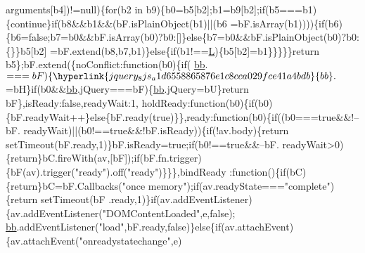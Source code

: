 \begin{DoxyCode}
      arguments[b4])!=null)\{\textcolor{keywordflow}{for}(b2 in b9)\{b0=b5[b2];b1=b9[b2];\textcolor{keywordflow}{if}(b5===b1)\{\textcolor{keywordflow}{continue}\}\textcolor{keywordflow}{if}(b8&&b1&&(bF.isPlainObject(b1)||(b6
      =bF.isArray(b1))))\{\textcolor{keywordflow}{if}(b6)\{b6=\textcolor{keyword}{false};b7=b0&&bF.isArray(b0)?b0:[]\}\textcolor{keywordflow}{else}\{b7=b0&&bF.isPlainObject(b0)?b0:\{\}\}b5[b2]
      =bF.extend(b8,b7,b1)\}\textcolor{keywordflow}{else}\{\textcolor{keywordflow}{if}(b1!==\hyperlink{jquery_8js_a38ee4c0b5f4fe2a18d0c783af540d253}{L})\{b5[b2]=b1\}\}\}\}\}\textcolor{keywordflow}{return} b5\};bF.extend(\{noConflict:\textcolor{keyword}{function}(b0)\{\textcolor{keywordflow}{if}(
      \hyperlink{jquery_8js_a1d6558865876e1c8cca029fce41a4bdb}{bb}.$===bF)\{\hyperlink{jquery_8js_a1d6558865876e1c8cca029fce41a4bdb}{bb}.$=bH\}\textcolor{keywordflow}{if}(b0&&\hyperlink{jquery_8js_a1d6558865876e1c8cca029fce41a4bdb}{bb}.jQuery===bF)\{\hyperlink{jquery_8js_a1d6558865876e1c8cca029fce41a4bdb}{bb}.jQuery=bU\}\textcolor{keywordflow}{return} bF\},isReady:\textcolor{keyword}{false},readyWait:1,
      holdReady:\textcolor{keyword}{function}(b0)\{\textcolor{keywordflow}{if}(b0)\{bF.readyWait++\}\textcolor{keywordflow}{else}\{bF.ready(\textcolor{keyword}{true})\}\},ready:\textcolor{keyword}{function}(b0)\{\textcolor{keywordflow}{if}((b0===\textcolor{keyword}{true}&&!--bF.
      readyWait)||(b0!==\textcolor{keyword}{true}&&!bF.isReady))\{\textcolor{keywordflow}{if}(!av.body)\{\textcolor{keywordflow}{return} setTimeout(bF.ready,1)\}bF.isReady=\textcolor{keyword}{true};\textcolor{keywordflow}{if}(b0!==\textcolor{keyword}{true}&&--bF.
      readyWait>0)\{\textcolor{keywordflow}{return}\}bC.fireWith(av,[bF]);\textcolor{keywordflow}{if}(bF.fn.trigger)\{bF(av).trigger(\textcolor{stringliteral}{"ready"}).off(\textcolor{stringliteral}{"ready"})\}\}\},bindReady
      :\textcolor{keyword}{function}()\{\textcolor{keywordflow}{if}(bC)\{\textcolor{keywordflow}{return}\}bC=bF.Callbacks(\textcolor{stringliteral}{"once memory"});\textcolor{keywordflow}{if}(av.readyState===\textcolor{stringliteral}{"complete"})\{\textcolor{keywordflow}{return} setTimeout(bF
      .ready,1)\}\textcolor{keywordflow}{if}(av.addEventListener)\{av.addEventListener(\textcolor{stringliteral}{"DOMContentLoaded"},e,\textcolor{keyword}{false});
      \hyperlink{jquery_8js_a1d6558865876e1c8cca029fce41a4bdb}{bb}.addEventListener(\textcolor{stringliteral}{"load"},bF.ready,\textcolor{keyword}{false})\}\textcolor{keywordflow}{else}\{\textcolor{keywordflow}{if}(av.attachEvent)\{av.attachEvent(\textcolor{stringliteral}{"onreadystatechange"},e)

\end{DoxyCode}
